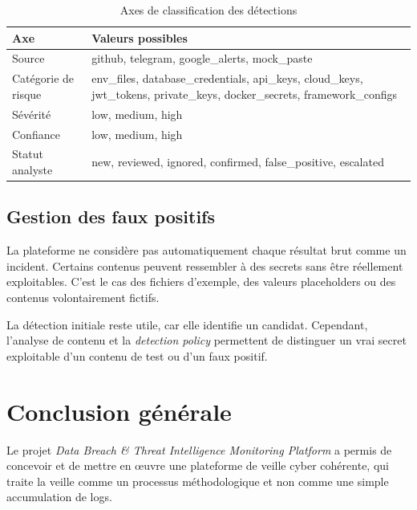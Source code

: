 \documentclass[12pt,a4paper]{report}
\newcommand{\projetnom}{Data Breach \& Threat Intelligence Monitoring Platform}
\begin{document}
\begin{table}[H]
\centering
\caption{Axes de classification des détections}
\label{tab:classification}
\begin{tabularx}{\linewidth}{|l|>{\raggedright\arraybackslash}X|}
\hline
\rowcolor{primary!15}
\textbf{Axe} & \textbf{Valeurs possibles} \\ \hline
Source & github, telegram, google\_alerts, mock\_paste \\ \hline
Catégorie de risque & env\_files, database\_credentials, api\_keys, cloud\_keys, jwt\_tokens, private\_keys, docker\_secrets, framework\_configs \\ \hline
Sévérité & low, medium, high \\ \hline
Confiance & low, medium, high \\ \hline
Statut analyste & new, reviewed, ignored, confirmed, false\_positive, escalated \\ \hline
\end{tabularx}
\end{table}

\section{Gestion des faux positifs}

La plateforme ne considère pas automatiquement chaque résultat brut comme un incident. Certains contenus peuvent ressembler à des secrets sans être réellement exploitables. C'est le cas des fichiers d'exemple, des valeurs placeholders ou des contenus volontairement fictifs.

La détection initiale reste utile, car elle identifie un candidat. Cependant, l'analyse de contenu et la \textit{detection policy} permettent de distinguer un vrai secret exploitable d'un contenu de test ou d'un faux positif.




\chapter*{Conclusion générale}

Le projet \textit{\projetnom{}} a permis de concevoir et de mettre en œuvre une plateforme de veille cyber cohérente, qui traite la veille comme un processus méthodologique et non comme une simple accumulation de logs.
\end{document}
